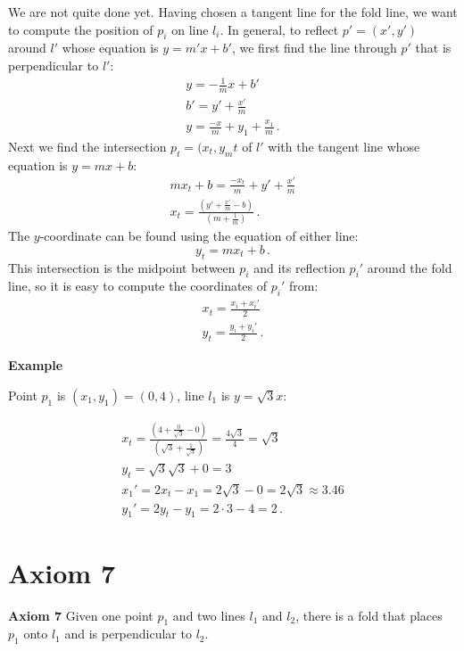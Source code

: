\documentclass[11pt,a4paper]{article}
\newcommand*{\disfrac}[2]{\displaystyle\frac{#1}{#2}}
\newenvironment{form}[1]{%
\begin{displaymath}%
\renewcommand{\arraystretch}{#1}%
\begin{array}{lcl}}%
{\end{array}%
\end{displaymath}%
}
\begin{document}
We are not quite done yet. Having chosen a tangent line for the fold line, we want to compute the position of $p_i$ on line $l_i$. In general, to reflect $p'=(x',y')$ around $l'$ whose equation is $y=m'x+b'$, we first find the line through $p'$ that is perpendicular to $l'$:
\begin{form}{1.5}
y=-\disfrac{1}{m}x+b'\\
b'=y'+\disfrac{x'}{m}\\
y=\disfrac{-x}{m}+y_1+\disfrac{x_1}{m}\,.
\end{form}
Next we find the intersection $p_t=(x_t,y_mt$ of $l'$ with the tangent line whose equation is $y=mx+b$:
\begin{form}{1.5}
mx_t+b=\disfrac{-x_t}{m}+y'+\disfrac{x'}{m}\\
x_t=\disfrac{\left(y'+\disfrac{x'}{m}-b\right)}{\left(m+\disfrac{1}{m}\right)}\,.
\end{form}
The $y$-coordinate can be found using the equation of either line:
\[
y_t=mx_t+b\,.
\]
This intersection is the midpoint between $p_i$ and its reflection $p_i'$ around the fold line, so it is easy to compute the coordinates of $p_i'$ from:
\begin{form}{1.5}
x_t=\disfrac{x_i+x_i'}{2}\\
y_t=\disfrac{y_i+y_i'}{2}\,.
\end{form}


\textbf{Example}

Point $p_1$ is $(x_1,y_1)=(0,4)$, line $l_1$ is $y=\sqrt{3}x$:

\begin{form}{1.5}
x_t=\disfrac{\left(4+\disfrac{0}{\sqrt{3}}-0\right)}{\left(\sqrt{3}+\disfrac{1}{\sqrt{3}}\right)}=\disfrac{4\sqrt{3}}{4}=\sqrt{3}\\
y_t=\sqrt{3}\sqrt{3}+0=3\\
x_1'=2x_t-x_1=2\sqrt{3}-0=2\sqrt{3}\approx 3.46\\
y_1'=2y_t-y_1=2\cdot 3 - 4 = 2\,.
\end{form}


\section{Axiom 7}

\textbf{Axiom 7} 
Given one point $p_1$ and two lines $l_1$ and $l_2$, there is a fold that places $p_1$ onto $l_1$ and is perpendicular to $l_2$.
\end{document}
